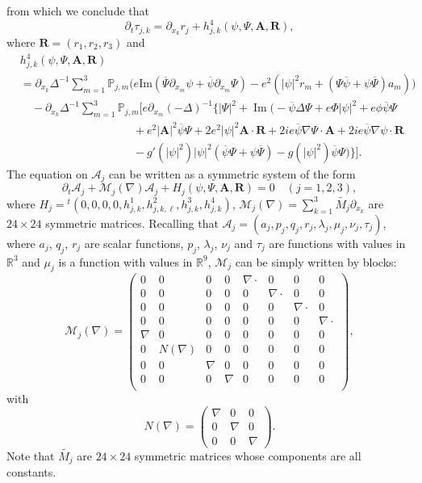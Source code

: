 \documentclass[AHL,Unicode,longabstracts]{cedram}
\newcommand{\BA}{\mathbf{A}}
\newcommand{\BR}{\mathbf{R}}
\newcommand{\R}{\mathbb{R}}
\DeclareMathOperator{\IM}{Im}
\begin{document}
from which we conclude that
\[
\partial_t \tau_{j,k}
= \partial_{x_k} r_j + h_{j,k}^4(\psi,\Psi,\BA, \BR),
\]
where $\BR=(r_1,r_2,r_3)$ and
\begin{align*}
&h^4_{j,k}(\psi,\Psi,\BA, \BR) \\
&=\partial_{x_k} \Delta^{-1}\sum_{m=1}^3 {\mathbb P}_{j,m}\Big(e\text{Im}(\overline{\Psi}\partial_{x_m}\psi + \overline{\psi}\partial_{x_m} \Psi) -e^2(|\psi|^2 r_m+(\Psi \overline{\psi}+\psi \overline{\Psi}) a_m)\Big) \\
&\quad -\partial_{x_k} \Delta^{-1}\sum_{m=1}^3 {\mathbb P}_{j,m} \Big[e \partial_{x_m} (-\Delta)^{-1} \Big\{ |\Psi|^2 + \IM \Big(-\overline{\psi} \Delta \Psi +e \Phi |\psi|^2 +e \phi \overline{\psi} \Psi \\
&\hspace{10em} +e^2 |\BA|^2 \overline{\psi} \Psi+ 2e^2 |\psi|^2 \BA \cdot \BR +2i e \overline{\psi} \nabla \Psi \cdot \BA +2i e \overline{\psi} \nabla \psi \cdot \BR \\
&\hspace{10em} -g'(|\psi|^2)|\psi|^2(\overline{\psi}\Psi+\psi\overline{\Psi}) - g(|\psi|^2) \overline{\psi} \Psi \Big) \Big\} \Big].
\end{align*}
The equation on $\mathcal{A}_j$ can be written as a symmetric system of the form
\[
\partial_t \mathcal{A}_j+\mathcal{M}_j(\nabla)\mathcal{A}_j +H_j(\psi,\Psi,\BA,\BR)=0 \quad (j=1,2,3),
\]
where $H_j={}^t (0,0,0,0,h_{j,k}^1, h_{j,k,\ell}^2, h_{j,k}^3, h_{j,k}^4)$, $\mathcal{M}_j(\nabla)= \sum_{k=1}^3 \widetilde{M_j} \partial_{x_k}$ are $24 \times 24$ symmetric matrices. Recalling that $\mathcal{A}_j=(a_j,p_j,q_j,r_j,\lambda_j,\mu_j,\nu_j,\tau_j)$, where $a_j$, $q_j$, $r_j$ are scalar functions, $p_j$, $\lambda_j$, $\nu_j$ and $\tau_j$ are functions with values in $\R^3$ and $\mu_j$ is a function with values in $\R^9$, $\mathcal{M}_j$ can be simply written by blocks:
\[
\mathcal{M}_j(\nabla)=
\left(
\begin{array}{cccccccc}
0&0&0&0&\nabla \cdot&0&0&0\\
0&0&0&0&0&\nabla \cdot&0&0\\
0&0&0&0&0&0&\nabla \cdot&0\\
0&0&0&0&0&0&0&\nabla \cdot \\
\nabla&0&0&0&0&0&0&0\\
0&N(\nabla)&0&0&0&0&0&0\\
0&0&\nabla&0&0&0&0&0\\
0&0&0&\nabla&0&0&0&0\\
\end{array}
\right),
\]
with
\[
N(\nabla)=
\left(
\begin{array}{ccc}
\nabla&0&0\\
0&\nabla&0\\
0&0&\nabla
\end{array}
\right).
\]
Note that $\widetilde{M_j}$ are $24 \times 24$ symmetric matrices whose components are all constants.
\end{document}
